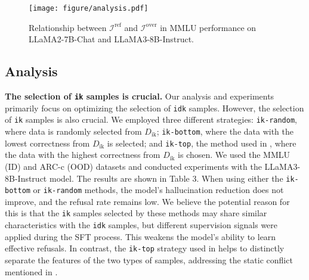 
\begin{figure}[t]
    \centering
    \texttt{[image: figure/analysis.pdf]}
    \caption{Relationship between \(\mathcal{I}^{\text{ref}}\) and \(\mathcal{I}^{\text{over}}\) in MMLU performance on LLaMA2-7B-Chat and LLaMA3-8B-Instruct.}
    \label{fig:analysis}
\end{figure}

\subsection{Analysis}
\textbf{The selection of \texttt{ik} samples is crucial.} Our analysis and experiments primarily focus on optimizing the selection of \texttt{idk} samples. However, the selection of \texttt{ik} samples is also crucial. We employed three different strategies: \texttt{ik-random}, where data is randomly selected from $D_{\text{ik}}$; \texttt{ik-bottom}, where the data with the lowest correctness from $D_{\text{ik}}$ is selected; and \texttt{ik-top}, the method used in \M, where the data with the highest correctness from $D_{\text{ik}}$ is chosen. We used the MMLU (ID) and ARC-c (OOD) datasets and conducted experiments with the LLaMA3-8B-Instruct model. The results are shown in Table 3. When using either the \texttt{ik-bottom} or \texttt{ik-random} methods, the model's hallucination reduction does not improve, and the refusal rate remains low. We believe the potential reason for this is that the \texttt{ik} samples selected by these methods may share similar characteristics with the \texttt{idk} samples, but different supervision signals were applied during the SFT process. This weakens the model’s ability to learn effective refusals. In contrast, the \texttt{ik-top} strategy used in \M helps to distinctly separate the features of the two types of samples, addressing the static conflict mentioned in \cite{zhu2024utilizeflowsteppingriver}.

